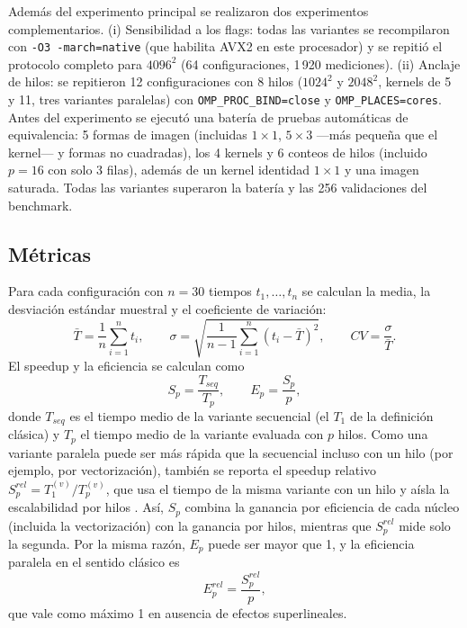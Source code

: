 \documentclass[12pt]{article}
\begin{document}
Además del experimento principal se realizaron dos experimentos complementarios. (i) Sensibilidad a los flags: todas las variantes se recompilaron con \texttt{-O3 -march=native} (que habilita AVX2 en este procesador) y se repitió el protocolo completo para $4096^2$ (64 configuraciones, 1\,920 mediciones). (ii) Anclaje de hilos: se repitieron 12 configuraciones con 8 hilos ($1024^2$ y $2048^2$, kernels de 5 y 11, tres variantes paralelas) con \texttt{OMP\_PROC\_BIND=close} y \texttt{OMP\_PLACES=cores}. Antes del experimento se ejecutó una batería de pruebas automáticas de equivalencia: 5 formas de imagen (incluidas $1\times1$, $5\times3$ ---más pequeña que el kernel--- y formas no cuadradas), los 4 kernels y 6 conteos de hilos (incluido $p = 16$ con solo 3 filas), además de un kernel identidad $1\times1$ y una imagen saturada. Todas las variantes superaron la batería y las 256 validaciones del benchmark.

\subsection{Métricas}
Para cada configuración con $n = 30$ tiempos $t_1, \dots, t_n$ se calculan la media, la desviación estándar muestral y el coeficiente de variación:
\begin{equation}
\bar{T} = \frac{1}{n}\sum_{i=1}^{n} t_i, \qquad \sigma = \sqrt{\frac{1}{n-1}\sum_{i=1}^{n} (t_i - \bar{T})^2}, \qquad CV = \frac{\sigma}{\bar{T}}.
\label{eq:stats}
\end{equation}
El speedup y la eficiencia se calculan como
\begin{equation}
S_p = \frac{T_{seq}}{T_p}, \qquad E_p = \frac{S_p}{p},
\label{eq:speedup}
\end{equation}
donde $T_{seq}$ es el tiempo medio de la variante secuencial (el $T_1$ de la definición clásica) y $T_p$ el tiempo medio de la variante evaluada con $p$ hilos. Como una variante paralela puede ser más rápida que la secuencial incluso con un hilo (por ejemplo, por vectorización), también se reporta el speedup relativo $S^{rel}_p = T^{(v)}_1 / T^{(v)}_p$, que usa el tiempo de la misma variante con un hilo y aísla la escalabilidad por hilos \cite{amdahl1967,gustafson1988,hoefler2015}. Así, $S_p$ combina la ganancia por eficiencia de cada núcleo (incluida la vectorización) con la ganancia por hilos, mientras que $S^{rel}_p$ mide solo la segunda. Por la misma razón, $E_p$ puede ser mayor que 1, y la eficiencia paralela en el sentido clásico es
\begin{equation}
E^{rel}_p = \frac{S^{rel}_p}{p},
\label{eq:erel}
\end{equation}
que vale como máximo 1 en ausencia de efectos superlineales.
\end{document}
